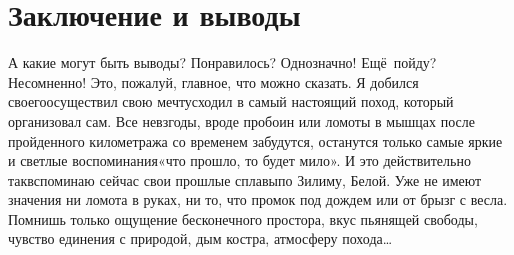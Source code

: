 \chapter{Заключение и выводы}

А какие могут быть выводы? Понравилось? Однозначно! Ещё~пойду? Несомненно! Это, пожалуй, главное, что можно сказать. Я добился своего\mdash осуществил свою мечту\mdash сходил в самый настоящий поход, который организовал сам. Все невзгоды, вроде пробоин или ломоты в мышцах после пройденного километража со временем забудутся, останутся только самые яркие и светлые воспоминания\mdash «что прошло, то будет мило». И это действительно так\mdash вспоминаю сейчас свои прошлые сплавы\mdash по Зилиму, Белой. Уже не имеют значения ни ломота в руках, ни то, что промок под дождем или от брызг с весла. Помнишь только ощущение бесконечного простора, вкус пьянящей свободы, чувство единения с природой, дым костра, атмосферу похода\ldots 

